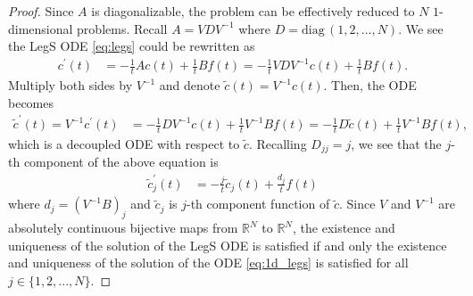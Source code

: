 \documentclass{article}
\theoremstyle{definition}
\newcommand{\derivative}[1]{#1^{\prime}}
\begin{document}
\begin{proof}
    Since $A$ is diagonalizable, the problem can be effectively reduced to $N$ $1$-dimensional problems. 
    Recall $A = VDV^{-1}$ where $D=\mathrm{diag}\,(1,2,\dots,N)$. 
    We see the LegS ODE \eqref{eq:legs} could be rewritten as 
    \begin{align*}
        \derivative{c}(t) 
        &= -\frac{1}{t} A c(t) + \frac{1}{t} B f(t) %
        = -\frac{1}{t} VDV^{-1} c(t) + \frac{1}{t} B f(t). 
    \end{align*}
    Multiply both sides by $V^{-1}$ and denote $\tilde{c}(t) = V^{-1}c(t)$. Then, the ODE becomes
    \begin{align*}
        \derivative{\tilde{c}}(t) = V^{-1}\derivative{c}(t) &= -\frac{1}{t} D V^{-1} c(t) + \frac{1}{t} V^{-1}B f(t) = -\frac{1}{t} D\tilde{c}(t) + \frac{1}{t} V^{-1}B f(t),
    \end{align*}
    which is a decoupled ODE with respect to $\tilde{c}$. Recalling $D_{jj} = j$, we see that the $j$-th component of the above equation is
    \begin{align}   
        \derivative{\tilde{c}}_j(t)&= -\frac{j}{t}\tilde{c}_j(t) + \frac{d_j}{t} f(t) \label{eq:1d_legs}
    \end{align}
    where $d_j = (V^{-1}B)_j$ and $\tilde{c}_j$ is $j$-th component function of $\tilde{c}$. %
    Since $V$ and $V^{-1}$ are absolutely continuous bijective maps from $\mathbb{R}^N$ to $\mathbb{R}^N$, 
    the existence and uniqueness of the solution of the LegS ODE is satisfied if and only the existence and uniqueness of the solution of the ODE \eqref{eq:1d_legs} is satisfied for all 
    $j \in \{1, 2, ..., N\}$. 


\end{proof}
\end{document}

